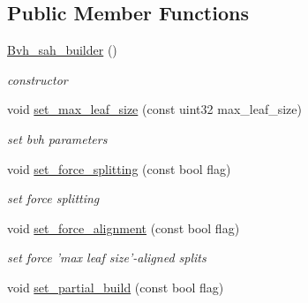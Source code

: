 \subsection*{\-Public \-Member \-Functions}
\begin{DoxyCompactItemize}
\item 
\hypertarget{classnih_1_1deprecated_1_1_bvh__sah__builder_a6590df8934a42d73ecd2d7089e0bb43a}{
\hyperlink{classnih_1_1deprecated_1_1_bvh__sah__builder_a6590df8934a42d73ecd2d7089e0bb43a}{\-Bvh\-\_\-sah\-\_\-builder} ()}
\label{classnih_1_1deprecated_1_1_bvh__sah__builder_a6590df8934a42d73ecd2d7089e0bb43a}

\begin{DoxyCompactList}\small\item\em constructor \end{DoxyCompactList}\item 
\hypertarget{classnih_1_1deprecated_1_1_bvh__sah__builder_a7a80ebc7842b083d1f8db1218f9bb5c3}{
void \hyperlink{classnih_1_1deprecated_1_1_bvh__sah__builder_a7a80ebc7842b083d1f8db1218f9bb5c3}{set\-\_\-max\-\_\-leaf\-\_\-size} (const uint32 max\-\_\-leaf\-\_\-size)}
\label{classnih_1_1deprecated_1_1_bvh__sah__builder_a7a80ebc7842b083d1f8db1218f9bb5c3}

\begin{DoxyCompactList}\small\item\em set bvh parameters \end{DoxyCompactList}\item 
\hypertarget{classnih_1_1deprecated_1_1_bvh__sah__builder_aa00f33c2609507097297d572f6e28172}{
void \hyperlink{classnih_1_1deprecated_1_1_bvh__sah__builder_aa00f33c2609507097297d572f6e28172}{set\-\_\-force\-\_\-splitting} (const bool flag)}
\label{classnih_1_1deprecated_1_1_bvh__sah__builder_aa00f33c2609507097297d572f6e28172}

\begin{DoxyCompactList}\small\item\em set force splitting \end{DoxyCompactList}\item 
\hypertarget{classnih_1_1deprecated_1_1_bvh__sah__builder_a6e9529f220ebb262c1ac78e832cf10da}{
void \hyperlink{classnih_1_1deprecated_1_1_bvh__sah__builder_a6e9529f220ebb262c1ac78e832cf10da}{set\-\_\-force\-\_\-alignment} (const bool flag)}
\label{classnih_1_1deprecated_1_1_bvh__sah__builder_a6e9529f220ebb262c1ac78e832cf10da}

\begin{DoxyCompactList}\small\item\em set force 'max leaf size'-\/aligned splits \end{DoxyCompactList}\item 
\hypertarget{classnih_1_1deprecated_1_1_bvh__sah__builder_a159570720ce4fa0fdb8ec452e93469e3}{
void \hyperlink{classnih_1_1deprecated_1_1_bvh__sah__builder_a159570720ce4fa0fdb8ec452e93469e3}{set\-\_\-partial\-\_\-build} (const bool flag)}
\label{classnih_1_1deprecated_1_1_bvh__sah__builder_a159570720ce4fa0fdb8ec452e93469e3}


\end{DoxyCompactItemize}
